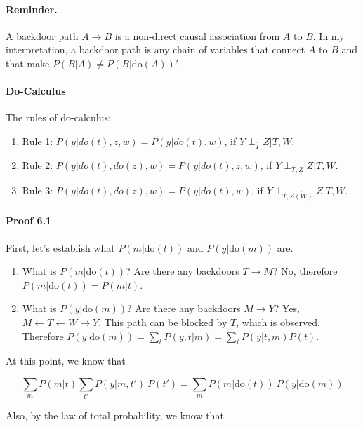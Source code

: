 \documentclass[a4paper]{article}
\begin{document}
\paragraph{Reminder.} A backdoor path $A \to B$ is a non-direct causal association from $A$ to $B$. In my interpretation, a backdoor path is any chain of variables that connect $A$ to $B$ and that make $P(B | A) \neq P(B | \mathrm{do}(A))'$. 

\paragraph{Do-Calculus} The rules of do-calculus:

\begin{enumerate}
    \item Rule 1: $P(y | do(t), z, w) = P(y | do(t), w)$, if $Y \perp_{\overline{T}} Z | T, W$.
    \item Rule 2: $P(y | do(t), do(z), w) = P(y | do(t), z, w)$, if $Y \perp_{\overline{T}, \underline{Z}} Z | T, W$.
    \item Rule 3: $P(y | do(t), do(z), w) = P(y | do(t), w)$, if $Y \perp_{\overline{T}, \overline{Z(W)}} Z | T, W$.
\end{enumerate}

\paragraph{Proof 6.1} First, let's establish what $P(m | \mathrm{do}(t))$ and $P(y | \mathrm{do}(m))$ are.

\begin{enumerate}
    \item What is $P(m | \mathrm{do}(t))$? Are there any backdoors $T \to M$? No, therefore $P(m | \mathrm{do}(t)) = P(m | t)$.
    \item What is $P(y | \mathrm{do}(m))$? Are there any backdoors $M \to Y$? Yes, $M \leftarrow T \leftarrow W \rightarrow Y$. This path can be blocked by $T$, which is observed. Therefore $P(y | \mathrm{do}(m)) = \sum_{t} P(y, t | m) = \sum_{t} P(y | t, m) P(t)$.
\end{enumerate}

At this point, we know that

\begin{equation}
    \sum_{m} P(m | t) \sum_{t'} P(y | m, t') ~ P(t') = \sum_{m} P(m | \mathrm{do} (t)) ~ P(y | \mathrm{do} (m))
\end{equation}

Also, by the law of total probability, we know that
\end{document}
